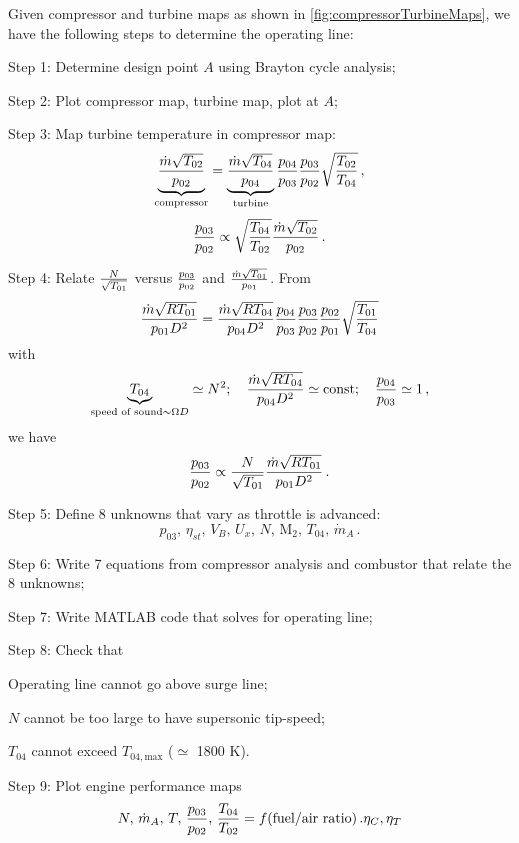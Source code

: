 Given compressor and turbine maps as shown in \cref{fig:compressorTurbineMaps}, we have the following steps to determine the operating line:
\begin{itemizePacked}
\item Step 1: Determine design point $A$ using Brayton cycle analysis;
\item Step 2: Plot compressor map, turbine map, plot at $A$;
\item Step 3: Map turbine temperature in compressor map:
  \[
    \underbrace{{\frac{\dot{m}\sqrt{T_{02}}}{p_{02}}}}_\text{compressor} = \underbrace{{\frac{\dot{m}\sqrt{T_{04}}}{p_{04}}}}_\text{turbine} {\frac{p_{04}}{p_{03}}} {\frac{p_{03}}{p_{02}}} \sqrt{{\frac{T_{02}}{T_{04}}}}\,,
  \]
  \[
    {\frac{p_{03}}{p_{02}}} \propto \sqrt{{\frac{T_{04}}{T_{02}}}} {\frac{\dot{m}\sqrt{T_{02}}}{p_{02}}}\,. 
  \]
\item Step 4: Relate ${\frac{N}{\sqrt{T_{01}}}}$ versus ${\frac{p_{03}}{p_{02}}}$ and $ {\frac{\dot{m}\sqrt{T_{01}}}{p_{01}}}$. From 
  \[
    {\frac{\dot{m}\sqrt{R T_{01}}}{p_{01} D^2}} = {\frac{\dot{m}\sqrt{R T_{04}}}{p_{04} D^2}} {\frac{p_{04}}{p_{03}}} {\frac{p_{03}}{p_{02}}} {\frac{p_{02}}{p_{01}}} \sqrt{{\frac{T_{01}}{T_{04}}}}
  \]
  with 
  \[
    \underbrace{T_{04}}_{\text{speed of sound} \sim \Omega D} \simeq N^2 ; \quad  {\frac{\dot{m}\sqrt{R T_{04}}}{p_{04} D^2}} \simeq \text{const} ; \quad {\frac{p_{04}}{p_{03}}} \simeq 1 \,,
  \]
  we have
  \[
    {\frac{p_{03}}{p_{02}}} \propto {\frac{N}{\sqrt{T_{01}}}}  {\frac{\dot{m}\sqrt{R T_{01}}}{p_{01} D^2}}\,.
  \]
\item Step 5: Define 8 unknowns that vary as throttle is advanced:
  \[
     p_{03},\, \eta_{st},\, V_B,\, U_x,\, N,\, \text{M}_2,\, T_{04},\, \dot{m}_A\,.
  \]
\item Step 6: Write 7 equations from compressor analysis and combustor that relate the 8 unknowns;
\item Step 7: Write MATLAB code that solves for operating line;
\item Step 8: Check that
  \begin{itemizePacked}
  \item Operating line cannot go above surge line;
  \item $N$ cannot be too large to have supersonic tip-speed;
  \item $T_{04}$ cannot exceed $T_{04, \text{max}}$ ($\simeq$ 1800 K).
  \end{itemizePacked}
\item Step 9: Plot engine performance maps
  \[
    N,\, \dot{m}_A,\, T,\, {\frac{p_{03}}{p_{02}}},\, {\frac{T_{04}}{T_{02}}} = f(\text{fuel/air ratio})\,. \eta_C, \eta_T
  \]
\end{itemizePacked}

























